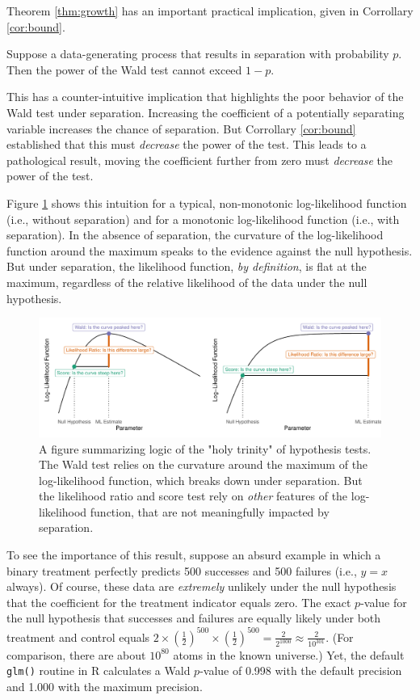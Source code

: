 \documentclass[
]{article}
\begin{document}
Theorem \ref{thm:growth} has an important practical implication, given
in Corrollary \ref{cor:bound}.

\begin{corrollary}\label{cor:bound}
Suppose a data-generating process that results in separation with probability $p$. Then the power of the Wald test cannot exceed $1 - p$.
\end{corrollary}

This has a counter-intuitive implication that highlights the poor
behavior of the Wald test under separation. Increasing the coefficient
of a potentially separating variable increases the chance of separation.
But Corrollary \ref{cor:bound} established that this must
\emph{decrease} the power of the test. This leads to a pathological
result, moving the coefficient further from zero must \emph{decrease}
the power of the test.

Figure \ref{fig:trinity} shows this intuition for a typical,
non-monotonic log-likelihood function (i.e., without separation) and for
a monotonic log-likelihood function (i.e., with separation). In the
absence of separation, the curvature of the log-likelihood function
around the maximum speaks to the evidence against the null hypothesis.
But under separation, the likelihood function, \emph{by definition}, is
flat at the maximum, regardless of the relative likelihood of the data
under the null hypothesis.

\begin{figure}[h]
\includegraphics[width=\textwidth]{doc/fig/intuition.pdf}
\caption{A figure summarizing logic of the "holy trinity" of hypothesis tests. The Wald test relies on the curvature around the maximum of the log-likelihood function, which breaks down under separation. But the likelihood ratio and score test rely on \textit{other} features of the log-likelihood function, that are not meaningfully impacted by separation.}\label{fig:trinity}
\end{figure}

To see the importance of this result, suppose an absurd example in which
a binary treatment perfectly predicts 500 successes and 500 failures
(i.e., \(y = x\) always). Of course, these data are \emph{extremely}
unlikely under the null hypothesis that the coefficient for the
treatment indicator equals zero. The exact \(p\)-value for the null
hypothesis that successes and failures are equally likely under both
treatment and control equals
\(2 \times \left( \frac{1}{2} \right)^{500} \times \left( \frac{1}{2} \right)^{500} = \frac{2}{2^{1000}} \approx \frac{2}{10^{301}}\).
(For comparison, there are about \(10^{80}\) atoms in the known
universe.) Yet, the default \texttt{glm()} routine in R calculates a
Wald \(p\)-value of 0.998 with the default precision and 1.000 with the
maximum precision.
\end{document}
